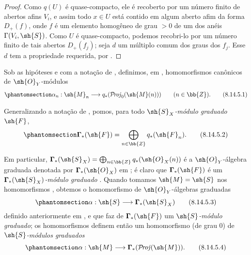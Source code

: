 \documentclass[oneside,10pt]{amsart}
\makeatletter
\newcommand{\ega@arrow}[2]{\mathchoice{#1}{#2}{#2}{#2}}
\renewcommand{\to}{\ega@arrow{\longrightarrow}{\rightarrow}}
\def\shProj{\mathcal{P}\!\mathit{roj}}
\newcommand{\oldpage}[2][]{\marginnote{\normalfont\footnotesize\textbf{#1}~|~#2}\ignorespaces}
\let\EGAOriginalLabel\label
\renewcommand{\label}[1]{\phantomsection\EGAOriginalLabel{#1}}
\makeatother
\begin{document}
\begin{proof}
Como $q(U)$ é quase-compacto, ele é recoberto por um número finito de abertos afins $V_i$, e assim todo $x\in U$ está contido em algum aberto afim da forma $D_+(f)$, onde $f$ é um elemento homogêneo de grau $>0$ de um dos anéis $\Gamma(V_i,\sh{S})$.
Como $U$ é quase-compacto, podemos recobri-lo por um número finito de tais abertos $D_+(f_j)$;
seja $d$ um múltiplo comum dos graus dos $f_j$.
Esse $d$ tem a propriedade requerida, por .
\end{proof}

\begin{env}[8.14.5]
\label{II.8.14.5}
Sob as hipóteses e com a notação de , definimos, em , homomorfismos canônicos de $\sh{O}_Y$-módulos
\[
\label{II.8.14.5.1}
    \alpha_n: \sh{M}_n \to q_*(\shProj_0(\sh{M}(n)))
    \qquad (n\in\bb{Z}).
\tag{8.14.5.1}
\]

Generalizando a notação de , pomos, para todo \emph{$\sh{S}_X$-módulo graduado $\sh{F}$},
\[
\label{II.8.14.5.2}
    \boldsymbol{\Gamma}_*(\sh{F}) = \bigoplus_{n\in\bb{Z}}q_*(\sh{F}_n).
\tag{8.14.5.2}
\]

Em particular, $\boldsymbol{\Gamma}_*(\sh{S}_X)=\bigoplus_{n\in\bb{Z}}q_*(\sh{O}_X(n))$ é a $\sh{O}_Y$-álgebra graduada denotada por $\boldsymbol{\Gamma}_*(\sh{O}_X)$ em ;
é claro que $\boldsymbol{\Gamma}_*(\sh{F})$ é um \emph{$\boldsymbol{\Gamma}_*(\sh{S}_X)$-módulo graduado} .
Quando
\oldpage[II]{199}
tomamos $\sh{M}=\sh{S}$ nos homomorfismos , obtemos o homomorfismo de $\sh{O}_Y$-álgebras graduadas
\[
\label{II.8.14.5.3}
    \alpha:\sh{S}\to\boldsymbol{\Gamma}_*(\sh{S}_X)
\tag{8.14.5.3}
\]
definido anteriormente em , e que faz de $\boldsymbol{\Gamma}_*(\sh{F})$ um \emph{$\sh{S}$-módulo graduado};
os homomorfismos  definem então um homomorfismo (de grau $0$) de \emph{$\sh{S}$-módulos graduados}
\[
\label{II.8.14.5.4}
    \alpha:\sh{M}\to\boldsymbol{\Gamma}_*(\shProj(\sh{M})).
\tag{8.14.5.4}
\]
\end{env}
\end{document}
